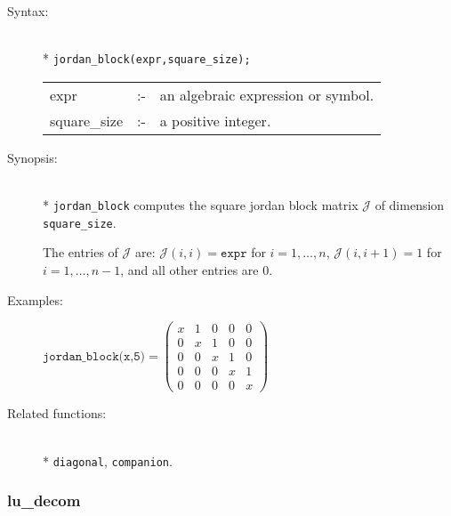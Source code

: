 \begin{description}
\item[Syntax:]\mbox{}\\*
\texttt{jordan\_block(expr,square\_size);}\\[2mm]
\begin{tabular}{l l l}
expr        &:-& an algebraic expression or symbol. \\
square\_size &:-& a positive integer.
\end{tabular}

\item[Synopsis:]\mbox{}\\*
\texttt{jordan\_block} computes the square jordan block matrix $\mathcal{J}$
                of dimension \texttt{square\_size}.

The entries of $\mathcal{J}$ are: $\mathcal{J}(i,i) = \texttt{expr}$ for
                $i=1,\ldots,n$, $\mathcal{J}(i,i+1) = 1$ for $i=1,\ldots,n-1$,
                and all other entries are 0.

\item[Examples:]\nopagebreak
\begin{flushleft}  
\begin{math}        
\texttt{jordan\_block(x,5)}  = 
 \begin{pmatrix} x & 1 & 0 & 0 & 0 \\ 0 & x & 1 & 0 & 0 \\ 0 
& 0 & x & 1 & 0 \\ 0 & 0 & 0 & x & 1 \\ 0 & 0 & 0 & 0 & x
 \end{pmatrix}
\end{math}  
\end{flushleft}

\item[Related functions:]\mbox{}\\*
\texttt{diagonal}, \texttt{companion}.
\end{description}


\subsubsection{lu\_decom}
\label{linalg:lu_decom}

